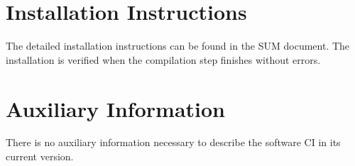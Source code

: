 


\chapter{Installation Instructions}

The detailed installation instructions can be found in the SUM document. The installation is verified when the compilation step finishes without errors.

\chapter{Auxiliary Information}

There is no auxiliary information necessary to describe the software CI in its current version.